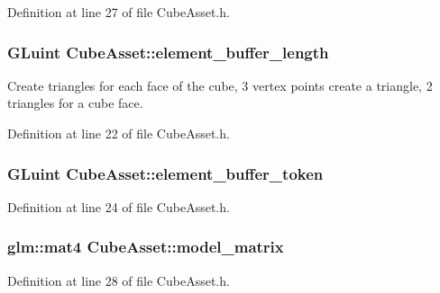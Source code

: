Definition at line 27 of file Cube\+Asset.\+h.

\hypertarget{class_cube_asset_ac66c2ec869f392515dad4ebda1fe4792}{}
\subsubsection[{element\+\_\+buffer\+\_\+length}]{\setlength{\rightskip}{0pt plus 5cm}G\+Luint Cube\+Asset\+::element\+\_\+buffer\+\_\+length\hspace{0.3cm}{\ttfamily [private]}}\label{class_cube_asset_ac66c2ec869f392515dad4ebda1fe4792}
Create triangles for each face of the cube, 3 vertex points create a triangle, 2 triangles for a cube face. 

Definition at line 22 of file Cube\+Asset.\+h.

\hypertarget{class_cube_asset_a4fae699256e7c5633a8174a93ca8a0ec}{}
\subsubsection[{element\+\_\+buffer\+\_\+token}]{\setlength{\rightskip}{0pt plus 5cm}G\+Luint Cube\+Asset\+::element\+\_\+buffer\+\_\+token\hspace{0.3cm}{\ttfamily [private]}}\label{class_cube_asset_a4fae699256e7c5633a8174a93ca8a0ec}


Definition at line 24 of file Cube\+Asset.\+h.

\hypertarget{class_cube_asset_a49b69783f209cc8268a8be7d46c803d6}{}
\subsubsection[{model\+\_\+matrix}]{\setlength{\rightskip}{0pt plus 5cm}glm\+::mat4 Cube\+Asset\+::model\+\_\+matrix\hspace{0.3cm}{\ttfamily [private]}}\label{class_cube_asset_a49b69783f209cc8268a8be7d46c803d6}


Definition at line 28 of file Cube\+Asset.\+h.

